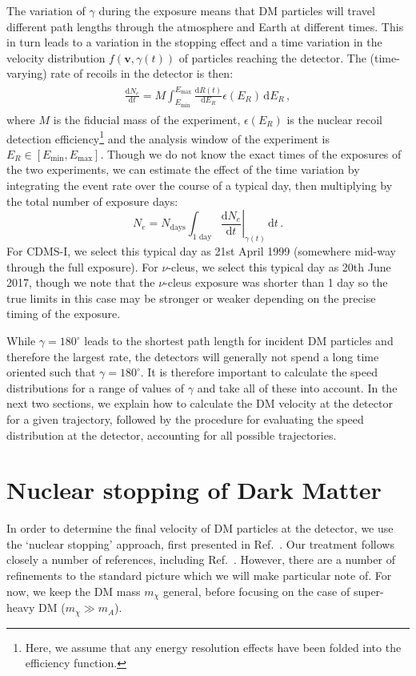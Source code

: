 \documentclass[prd,twocolumn,showpacs,nofootinbib,aps]{revtex4-1}
\newcommand{\dbd}[2]{\frac{\mathrm{d}#1}{\mathrm{d}#2}}
\begin{document}
The variation of $\gamma$ during the exposure means that DM particles will travel different path lengths through the atmosphere and Earth at different times. This in turn leads to a variation in the stopping effect and a time variation in the velocity distribution $f(\mathbf{v}, \gamma(t))$ of particles reaching the detector. The (time-varying) rate of recoils in the detector is then:
\begin{align}
\begin{split}
\dbd{N_e}{t} = M \int_{E_\mathrm{min}}^{E_\mathrm{max}} \dbd{R(t)}{E_R} \epsilon(E_R) \,\mathrm{d}E_R\,,
\end{split}
\end{align}
where $M$ is the fiducial mass of the experiment, $\epsilon(E_R)$ is the nuclear recoil detection efficiency\footnote{Here, we assume that any energy resolution effects have been folded into the efficiency function.} and the analysis window of the experiment is $E_R \in [E_\mathrm{min}, E_\mathrm{max}]$. Though we do not know the exact times of the exposures of the two experiments, we can estimate the effect of the time variation by integrating the event rate over the course of a typical day, then multiplying by the total number of exposure days:
\begin{equation}
\label{eq:Nexp}
N_e = N_\mathrm{days} \int_{\mathrm{1\,\,day}} \left.\dbd{N_e}{t}\right|_{ \gamma(t)} \,\mathrm{d}t\,.
\end{equation}
For CDMS-I, we select this typical day as 21st April 1999 (somewhere mid-way through the full exposure). For $\nu$-cleus, we select this typical day as 20th June 2017, though we note that the $\nu$-cleus exposure was shorter than 1 day so the true limits in this case may be stronger or weaker depending on the precise timing of the exposure.

While $\gamma = 180^\circ$ leads to the shortest path length for incident DM particles and therefore the largest rate, the detectors will generally not spend a long time oriented such that $\gamma = 180^\circ$. It is therefore important to calculate the speed distributions for a range of values of $\gamma$ and take all of these into account. In the next two sections, we explain how to calculate the DM velocity at the detector for a given trajectory, followed by the procedure for evaluating the speed distribution at the detector, accounting for all possible trajectories.


\section{Nuclear stopping of Dark Matter}
\label{sec:NuclearStopping}
In order to determine the final velocity of DM particles at the detector, we use the `nuclear stopping' approach, first presented in Ref.~\cite{Starkman:1990nj}. Our treatment follows closely a number of references, including Ref.~\cite{Davis:2017noy}. However, there are a number of refinements to the standard picture which we will make particular note of. For now, we keep the DM mass $m_\chi$ general, before focusing on the case of super-heavy DM ($m_\chi \gg m_A$).
\end{document}
